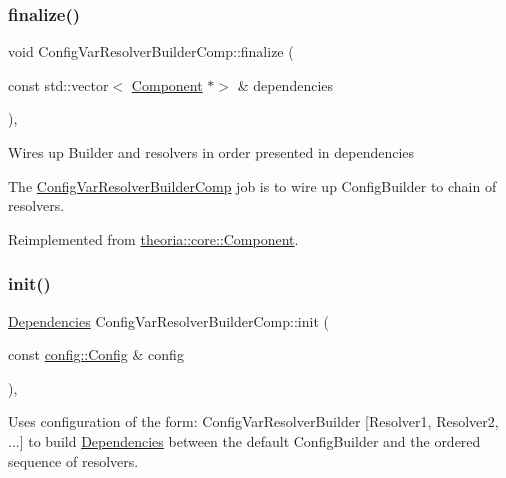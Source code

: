 \subsubsection{\texorpdfstring{finalize()}{finalize()}}
{\footnotesize\ttfamily void Config\+Var\+Resolver\+Builder\+Comp\+::finalize (\begin{DoxyParamCaption}\item[{const std\+::vector$<$ \hyperlink{classtheoria_1_1core_1_1Component}{Component} $\ast$$>$ \&}]{dependencies }\end{DoxyParamCaption})\hspace{0.3cm}{\ttfamily [override]}, {\ttfamily [virtual]}}

Wires up Builder and resolvers in order presented in dependencies

The \hyperlink{classtheoria_1_1core_1_1ConfigVarResolverBuilderComp}{Config\+Var\+Resolver\+Builder\+Comp} job is to wire up Config\+Builder to chain of resolvers. 

Reimplemented from \hyperlink{classtheoria_1_1core_1_1Component_afd8acc89e2cd36e92bebe7e6fa530764}{theoria\+::core\+::\+Component}.

\mbox{\label{classtheoria_1_1core_1_1ConfigVarResolverBuilderComp_aadf94c8b3d765667eaf9d7c91ac65342}} 
\subsubsection{\texorpdfstring{init()}{init()}}
{\footnotesize\ttfamily \hyperlink{classtheoria_1_1core_1_1Dependencies}{Dependencies} Config\+Var\+Resolver\+Builder\+Comp\+::init (\begin{DoxyParamCaption}\item[{const \hyperlink{classtheoria_1_1config_1_1Config}{config\+::\+Config} \&}]{config }\end{DoxyParamCaption})\hspace{0.3cm}{\ttfamily [override]}, {\ttfamily [virtual]}}

Uses configuration of the form\+: Config\+Var\+Resolver\+Builder \mbox{[}Resolver1, Resolver2, ...\mbox{]} to build \hyperlink{classtheoria_1_1core_1_1Dependencies}{Dependencies} between the default Config\+Builder and the ordered sequence of resolvers. 

